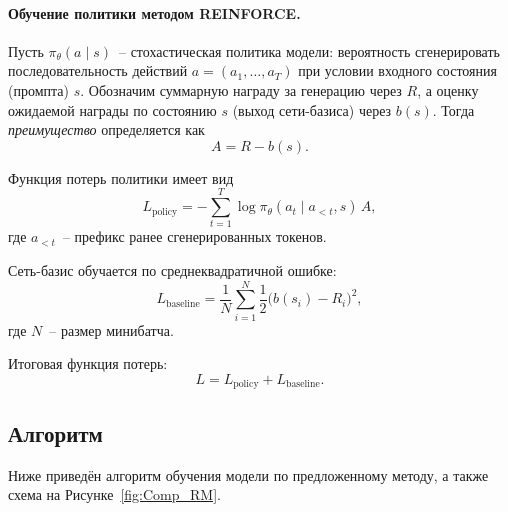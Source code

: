 \paragraph{Обучение политики методом REINFORCE.}

Пусть $\pi_\theta(a \mid s)$~-- стохастическая политика модели: вероятность 
сгенерировать последовательность действий $a = (a_1, \dots, a_T)$ 
при условии входного состояния (промпта) $s$. Обозначим суммарную награду 
за генерацию через $R$, а оценку ожидаемой награды по состоянию $s$ 
(выход сети-базиса) через $b(s)$. Тогда \emph{преимущество} определяется как
\begin{equation}
    A = R - b(s).
\end{equation}

Функция потерь политики имеет вид
\begin{equation}
    L_{\text{policy}}
    = - \sum_{t=1}^{T} \log \pi_\theta(a_t \mid a_{<t}, s)\, A,
\end{equation}
где $a_{<t}$~-- префикс ранее сгенерированных токенов.

Сеть-базис обучается по среднеквадратичной ошибке:
\begin{equation}
    L_{\text{baseline}}
    = \frac{1}{N} \sum_{i=1}^{N} \frac{1}{2}\bigl( b(s_i) - R_i \bigr)^2,
\end{equation}
где $N$~-- размер минибатча.

Итоговая функция потерь:
\begin{equation}
    L = L_{\text{policy}} + L_{\text{baseline}}.
\end{equation}


\subsection{Алгоритм}

Ниже приведён алгоритм обучения модели по предложенному методу,
а также схема на Рисунке~\ref{fig:Comp_RM}.

